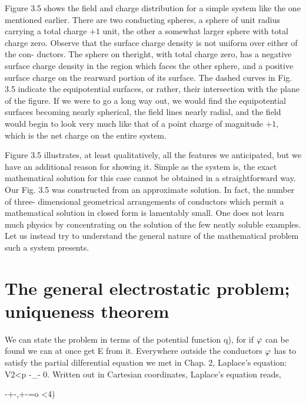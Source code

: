 Figure 3.5 shows the field and charge distribution for a simple
system like the one mentioned earlier. There are two conducting
spheres, a sphere of unit radius carrying a total charge $+1$ unit, the
other a somewhat larger sphere with total charge zero. Observe that
the surface charge density is not uniform over either of the con-
ductors. The sphere on theright, with total charge zero, has a negative
surface charge density in the region which faces the other sphere,
and a positive surface charge on the rearward portion of its surface.
The dashed curves in Fig. 3.5 indicate the equipotential surfaces, or
rather, their intersection with the plane of the figure. If we were to
go a long way out, we would find the equipotential surfaces becoming
nearly spherical, the field lines nearly radial, and the field would
begin to look very much like that of a point charge of magnitude $+1$,
which is the net charge on the entire system.

Figure 3.5 illustrates, at least qualitatively, all the features we
anticipated, but we have an additional reason for showing it. Simple
as the system is, the exact mathematical solution for this case cannot
be obtained in a straightforward way. Our Fig. 3.5 was constructed
from an approximate solution. In fact, the number of three-
dimensional geometrical arrangements of conductors which permit
a mathematical solution in closed form is lamentably small. One
does not learn much physics by concentrating on the solution of the
few neatly soluble examples. Let us instead try to understand the
general nature of the mathematical problem such a system presents.

\iffalse

\section{The general electrostatic problem; uniqueness theorem}

We can state the problem in terms of the potential function q),
for if $\varphi$ can be found we can at once get E from it. Everywhere outside
the conductors $\varphi$ has to satisfy the partial dilferential equation
we met in Chap. 2, Laplace's equation: V2<p -_- 0. Written out in
Cartesian coordinates, Laplace's equation reads,

-+-,+-=o <4)

